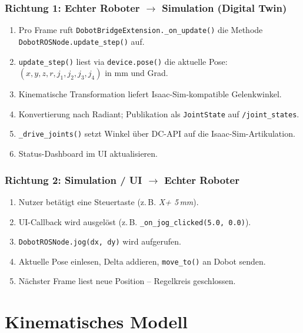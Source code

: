 \documentclass[11pt,a4paper]{article}
\begin{document}
\subsubsection{Richtung 1: Echter Roboter \texorpdfstring{$\to$}{->} Simulation (Digital Twin)}

\begin{enumerate}
  \item Pro Frame ruft \texttt{DobotBridgeExtension.\_on\_update()}
        die Methode \texttt{DobotROSNode.update\_step()} auf.
  \item \texttt{update\_step()} liest via
        \texttt{device.pose()} die aktuelle Pose:
        $(x, y, z, r, j_1, j_2, j_3, j_4)$ in mm und Grad.
  \item Kinematische Transformation liefert
        Isaac-Sim-kompatible Gelenkwinkel.
  \item Konvertierung nach Radiant; Publikation als
        \texttt{JointState} auf \texttt{/joint\_states}.
  \item \texttt{\_drive\_joints()} setzt Winkel über
        DC-API auf die Isaac-Sim-Artikulation.
  \item Status-Dashboard im UI aktualisieren.
\end{enumerate}

\subsubsection{Richtung 2: Simulation / UI \texorpdfstring{$\to$}{->} Echter Roboter}

\begin{enumerate}
  \item Nutzer betätigt eine Steuertaste
        (z.\,B. \textit{X+ 5\,mm}).
  \item UI-Callback wird ausgelöst
        (z.\,B. \texttt{\_on\_jog\_clicked(5.0, 0.0)}).
  \item \texttt{DobotROSNode.jog(dx, dy)} wird aufgerufen.
  \item Aktuelle Pose einlesen, Delta addieren,
        \texttt{move\_to()} an Dobot senden.
  \item Nächster Frame liest neue Position -- Regelkreis geschlossen.
\end{enumerate}

\section{Kinematisches Modell}
\label{sec:kinematik}
\end{document}
